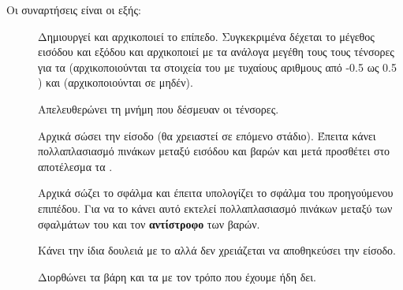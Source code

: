 Οι συναρτήσεις είναι οι εξής:
\begin{description}
    \item[] Δημιουργεί και αρχικοποιεί το επίπεδο. Συγκεκριμένα δέχεται το μέγεθος εισόδου και εξόδου και αρχικοποιεί με τα ανάλογα μεγέθη τους τους τένσορες για τα  (αρχικοποιούνται τα στοιχεία του με
    τυχαίους αριθμους από -0.5 ως 0.5 )  και  (αρχικοποιούνται σε μηδέν).
    \item[] Απελευθερώνει τη μνήμη που δέσμευαν οι τένσορες.
    \item[] Αρχικά σώσει την είσοδο (θα χρειαστεί σε επόμενο στάδιο). Έπειτα κάνει πολλαπλασιασμό πινάκων μεταξύ εισόδου και βαρών και μετά προσθέτει στο αποτέλεσμα τα .
    \item[] Αρχικά σώζει το σφάλμα και έπειτα υπολογίζει το σφάλμα του προηγούμενου επιπέδου. Για να το κάνει αυτό εκτελεί πολλαπλασιασμό πινάκων μεταξύ των σφαλμάτων του και τον \textbf{αντίστροφο} των βαρών.
    \item[] Κάνει την ίδια δουλειά με το  αλλά δεν χρειάζεται να αποθηκεύσει την είσοδο.
    \item[] Διορθώνει τα βάρη και τα  με τον τρόπο που έχουμε ήδη δει.
\end{description}

